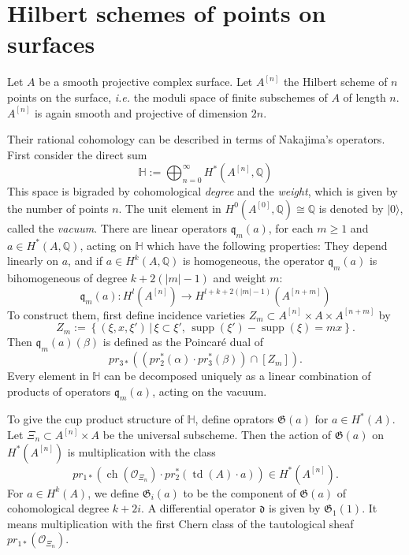 \documentclass{amsart}
\DeclareMathOperator{\Hilb}{Hilb}
\DeclareMathOperator{\ch}{ch}
\DeclareMathOperator{\td}{td}
\DeclareMathOperator{\supp}{supp}
\newcommand{\hilb}[1]{^{[#1]}}
\newcommand{\ie}{{\it i.e. }}
\newcommand{\vac}{|0\rangle}
\newcommand{\G}{\mathfrak{G}}
\newcommand{\q}{\mathfrak{q}}
\renewcommand{\H}{\mathbb{H}}
\newcommand{\Q}{\mathbb{Q}}
\theoremstyle{plain}
\theoremstyle{definition}
\theoremstyle{remark}
\begin{document}
\section{Hilbert schemes of points on surfaces}
Let $A$ be a smooth projective complex surface. Let $A\hilb{n}$ the Hilbert scheme of $n$ points on the surface, \ie the moduli space of finite subschemes of $A$ of length $n$.
$A\hilb{n}$ is again smooth and projective of dimension $2n$. 

Their rational cohomology can be described in terms of Nakajima's operators. First consider the direct sum
$$
\H := \bigoplus_{n=0}^{\infty} H^*(A\hilb{n},\Q)
$$
This space is bigraded by cohomological \emph{degree} and the \emph{weight}, which is given by the number of points $n$. The unit element in $H^0(A\hilb{0},\Q) \cong \Q$ is denoted by $\vac$, called the \emph{vacuum}.
There are linear operators $\q_m(a)$, for each $m\geq 1$ and $a \in H^*(A,\Q)$, acting on $\H$ which have the following properties: They depend linearly on $a$, and if $a\in H^k(A,\Q)$ is homogeneous, the operator $\q_{m}(a)$ is bihomogeneous of degree $k+2(|m|-1)$ and weight $m$:
$$
\q_{m}(a) : H^l(A\hilb{n}) \rightarrow H^{l+k+2(|m|-1)}(A\hilb{n+m})
$$
To construct them, first define incidence varieties $Z_m\subset A\hilb{n}\times A\times A\hilb{n+m}$ by
$$
Z_m := \left\{(\xi,x,\xi')\, |\, \xi\subset\xi',\, \supp(\xi') -\supp(\xi) = mx \right\}.
$$
Then $\q_m(a)(\beta) $ is defined as the Poincar\'e dual of 
$$
pr_{3*}\left( \left(pr_2^*(\alpha)\cdot pr_3^*(\beta)\right) \cap [Z_m] \right).
$$
Every element in $\H$ can be decomposed uniquely as a linear combination of products of operators $\q_{m}(a)$, acting on the vacuum. 

To give the cup product structure of $\H$, define oprators $\G(a)$ for $a \in H^*(A)$. Let $\Xi_n \subset A\hilb{n}\times A$ be the universal subscheme. Then the action of $\G(a)$ on $H^*(A\hilb{n})$ is multiplication with the class
$$
pr_{1*}\left( \ch(\mathcal{O}_{\Xi_n})\cdot pr_2^*(\td(A)\cdot a) \right) \in H^*(A\hilb{n}).
$$
For $a \in H^k(A)$, we define $\G_i(a)$ to be the component of $\G(a)$ of cohomological degree $k+2i$. A differential operator $\mathfrak{d}$ is given by $\G_1(1)$. It means multiplication with the first Chern class of the tautological sheaf $pr_{1*}\left( \mathcal{O}_{\Xi_n}\right)$.
\end{document}
